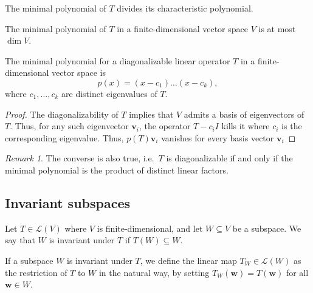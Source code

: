\documentclass[11pt]{article}
\renewcommand{\vec}[1]{\boldsymbol{#1}}
\newcommand{\vv}{\vec{v}}
\newcommand{\vw}{\vec{w}}
\newcommand{\alg}[1]{\mathscr{#1}}
\newcommand{\algL}{\alg{L}}
\theoremstyle{definition}
\theoremstyle{remark}
\newtheorem*{remark}{Remark}
\numberwithin{equation}{section}
\begin{document}
    \begin{corollary}
        The minimal polynomial of $T$ divides its characteristic polynomial.
    \end{corollary}
    \begin{corollary}
        The minimal polynomial of $T$ in a finite-dimensional vector space $V$ is
        at most $\dim{V}$.
    \end{corollary}

    \begin{theorem}
        The minimal polynomial for a diagonalizable linear operator $T$ in a
        finite-dimensional vector space is \[
            p(x) = (x - c_1) \dots (x - c_k),
        \] where $c_1, \dots, c_k$ are distinct eigenvalues of $T$.
    \end{theorem}
    \begin{proof}
        The diagonalizability of $T$ implies that $V$ admits a basis of eigenvectors
        of $T$. Thus, for any such eigenvector $\vv_i$, the operator $T - c_iI$ kills
        it where $c_i$ is the corresponding eigenvalue. Thus, $p(T)\vv_i$ vanishes
        for every basis vector $\vv_i$
    \end{proof}
    \begin{remark}
        The converse is also true, i.e.\ $T$ is diagonalizable if and only if the
        minimal polynomial is the product of distinct linear factors.
    \end{remark}

    \subsection{Invariant subspaces}

    \begin{definition}
        Let $T \in \algL(V)$ where $V$ is finite-dimensional, and let $W \subseteq V$
        be a subspace. We say that $W$ is invariant under $T$ if $T(W) \subseteq W$.

        If a subspace $W$ is invariant under $T$, we define the linear map
        $T_W \in\algL(W)$ as the restriction of $T$ to $W$ in the natural way, by
        setting $T_W(\vw) = T(\vw)$ for all $\vw \in W$.
    \end{definition}
\end{document}
